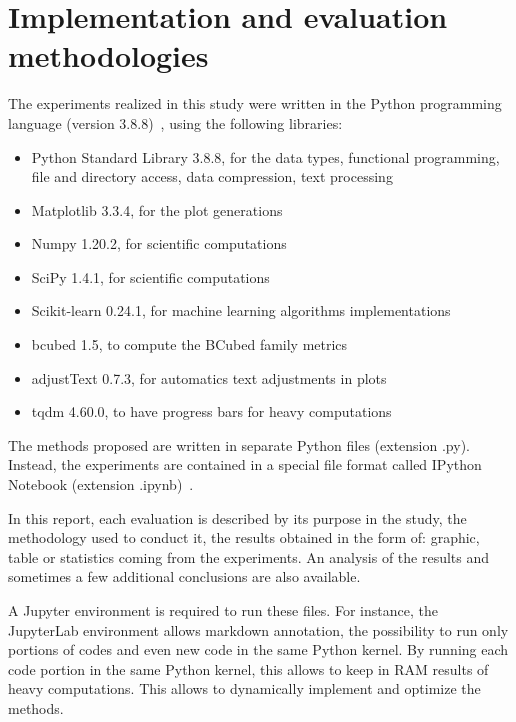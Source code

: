 \section{Implementation and evaluation methodologies}

The experiments realized in this study were written in the Python programming language (version 3.8.8)~\cite{python}, using the following libraries:

\begin{itemize}
  \item Python Standard Library 3.8.8, for the data types, functional programming, file and directory access, data compression, text processing~\cite{python_standard_library}
  \item Matplotlib 3.3.4, for the plot generations~\cite{matplotlib}
  \item Numpy 1.20.2, for scientific computations~\cite{numpy}
  \item SciPy 1.4.1, for scientific computations~\cite{scipy}
  \item Scikit-learn 0.24.1, for machine learning algorithms implementations~\cite{sklearn}
  \item bcubed 1.5, to compute the BCubed family metrics~\cite{bcubed_gh}
  \item adjustText 0.7.3, for automatics text adjustments in plots~\cite{adjustText}
  \item tqdm 4.60.0, to have progress bars for heavy computations~\cite{tqdm}
\end{itemize}

The methods proposed are written in separate Python files (extension .py).
Instead, the experiments are contained in a special file format called IPython Notebook (extension .ipynb)~\cite{jupyter}.

In this report, each evaluation is described by its purpose in the study, the methodology used to conduct it, the results obtained in the form of: graphic, table or statistics coming from the experiments.
An analysis of the results and sometimes a few additional conclusions are also available.

A Jupyter environment is required to run these files.
For instance, the JupyterLab environment allows markdown annotation, the possibility to run only portions of codes and even new code in the same Python kernel.
By running each code portion in the same Python kernel, this allows to keep in RAM results of heavy computations.
This allows to dynamically implement and optimize the methods.
